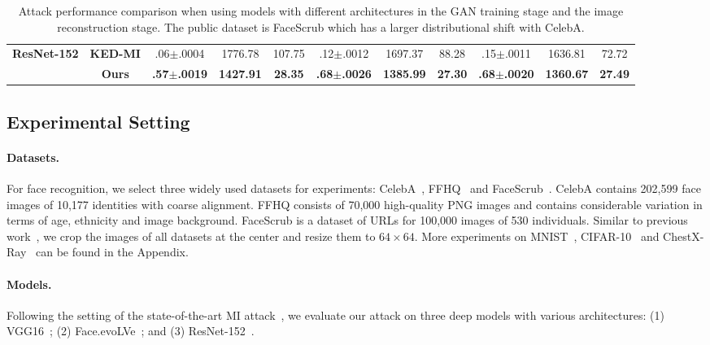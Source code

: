 \documentclass[letterpaper]{article} %
\begin{document}
\begin{table}[ht!]
{\begin{tabular}{@{}ccccccccccc@{}}
    \multirow{2}{*}{\textbf{ResNet-152}}             & \textbf{KED-MI}           & .06$\pm$.0004                        & 1776.78                        & 107.75                    & .12$\pm$.0012                      & 1697.37                        & 88.28                     & .15$\pm$.0011                      & 1636.81                        & 72.72                     \\
                                                        & \textbf{Ours}             & \textbf{.57$\pm$.0019}               & \textbf{1427.91}               & \textbf{28.35}            & \textbf{.68$\pm$.0026}             & \textbf{1385.99}               & \textbf{27.30}            & \textbf{.68$\pm$.0020}             & \textbf{1360.67}               & \textbf{27.49}            \\ \bottomrule
\end{tabular}
}
\caption{Attack performance comparison when using models with different architectures in the GAN training stage and the image reconstruction stage. The public dataset is FaceScrub which has a larger distributional shift with CelebA.}
\label{tab: cross_model_dataset_results2}
\end{table}


\subsection{Experimental Setting}
	
\paragraph{Datasets.}
For face recognition, we select three widely used datasets for experiments: CelebA~\cite{liu2015deep}, FFHQ~\cite{karras2019style} and FaceScrub~\cite{ng2014data}. CelebA contains 202,599 face images of 10,177 identities with coarse alignment. FFHQ consists of 70,000 high-quality PNG images and contains considerable variation in terms of age, ethnicity and image background. FaceScrub is a dataset of URLs for 100,000 images of 530 individuals. Similar to previous work~\cite{zhang2020secret, chen2021knowledge, kahla2022label}, we crop the images of all datasets at the center and resize them to $64 \times 64$. More experiments on MNIST~\cite{lecun1998gradient}, CIFAR-10~\cite{krizhevsky2009learning} and ChestX-Ray~\cite{wang2017chestx} can be found in the Appendix.

\paragraph{Models.}
Following the setting of the state-of-the-art MI attack~\cite{chen2021knowledge}, we evaluate our attack on three deep models with various architectures: (1) VGG16~\cite{simonyan2014very}; (2) Face.evoLVe~\cite{cheng2017know}; and (3) ResNet-152~\cite{he2016deep}.
\end{document}
